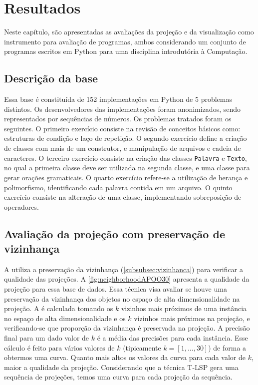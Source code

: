 \chapter{Resultados}
\label{chap:resultados}

	Neste capítulo, são apresentadas as avaliações da projeção e da visualização como
	instrumento para avaliação de programas, ambos considerando um conjunto de
	programas escritos em Python para uma disciplina introdutória à Computação.
	
	
	\section{Descrição da base}
	\label{sec:resultados:base-apoo}

		Essa base é constituída de 152 implementações em Python de 5 problemas distintos.
		Os desenvolvedores das implementações foram anonimizados, sendo representados por 
		sequências de números. Os problemas tratados foram os seguintes. O primeiro exercício
		consiste na revisão de conceitos básicos como: estruturas de condição e laço de repetição. O
		segundo exercício define a criação de classes com mais de um construtor, e manipulação de
		arquivos e cadeia de caracteres. O terceiro exercício consiste na criação das classes
		\texttt{Palavra} e \texttt{Texto}, no qual a primeira classe deve ser utilizada na segunda
		classe, e uma classe para gerar orações gramaticais. O quarto exercício refere-se a
		utilização de herança e polimorfismo, identificando cada palavra contida em um arquivo. O
		quinto exercício consiste na alteração de uma classe, implementando sobreposição de
		operadores. 
		
	
	\section{Avaliação da projeção com preservação de vizinhança}

		A  utiliza a preservação da vizinhança
		(\cref{subsubsec:vizinhanca}) para verificar a qualidade das projeções. A \cref{fig:neighborhoodAPOO30}
		apresenta a qualidade da projeção para essa base de dados. Essa técnica visa avaliar
		se houve uma preservação da vizinhança dos objetos no espaço de alta dimensionalidade
		na projeção. A  é calculada tomando os $k$ vizinhos
		mais próximos de uma instância no espaço de alta dimensionalidade e os $k$ vizinhos
		mais próximos na projeção, e verificando-se que proporção da vizinhança é preservada
		na projeção. A precisão final para um dado valor de $k$ é a média das precisões para
		cada instância. Esse cálculo é feito para vários valores de $k$ (tipicamente $k = [1,...,30]$)
		de forma a obtermos uma curva. Quanto mais altos os valores da curva para cada valor
		de $k$, maior a qualidade da projeção. Considerando que a técnica \acl{T-LSP} \cite{Alencar}
		gera uma sequência de projeções, temos uma curva para cada projeção da
		sequência.
		
